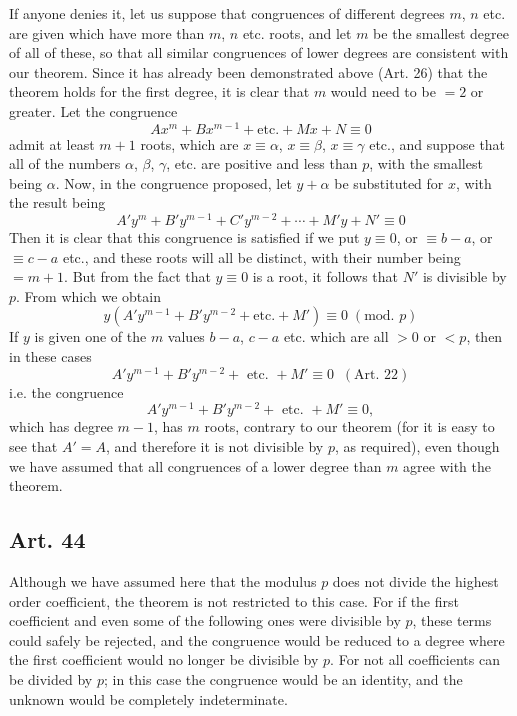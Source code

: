 \documentclass{book}
\theoremstyle{plain}
\theoremstyle{remark}
\begin{document}
If anyone denies it, let us suppose that congruences of different degrees $m$, $n$ etc. are given which have more than $m$, $n$ etc. roots, and let $m$ be the smallest degree of all of these, so that all similar congruences of lower degrees are consistent with our theorem.  Since it has already been demonstrated above (Art. 26) that the theorem holds for the first degree, it is clear that $m$ would need to be $=2$ or greater.  Let the congruence 
\[ Ax^m + Bx^{m-1} + \textrm{etc.} + Mx + N \equiv 0 \]
admit at least $m+1$ roots, which are $x \equiv \alpha$, $x \equiv \beta$, $x \equiv \gamma$ etc., and suppose that all of the numbers $\alpha$, $\beta$, $\gamma$, etc. are positive and less than $p$, with the smallest being $\alpha$.  Now, in the congruence proposed, let $y+\alpha$ be substituted for $x$, with the result being
\[ A' y^m + B' y^{m-1} + C' y^{m-2} + \cdots + M' y + N' \equiv 0 \]
Then it is clear that this congruence is satisfied if we put $y \equiv 0$, or $\equiv b-a$, or $\equiv c-a$ etc., and these roots will all be distinct, with their number being $=m+1$.   But from the fact that $y \equiv 0$ is a root, it follows that $N'$ is divisible by $p$. From which we obtain
\[ y(A'y^{m-1} + B'y^{m-2} + \textrm{etc.} +M' ) \equiv 0 \;(\textrm{mod. } p) \]
If $y$ is given one of the $m$ values $b-a$, $c-a$ etc. which are all $>0$ or $<p$, then in these cases
\[ A'y^{m-1} + B'y^{m-2} + \textrm{ etc. } + M' \equiv 0 \;\;(\textrm{Art. 22}) \]
i.e. the congruence 
\[ A'y^{m-1} + B'y^{m-2} + \textrm{ etc. } + M' \equiv 0, \]
which has degree $m-1$, has $m$ roots, contrary to our theorem (for it is easy to see that $A'=A$, and therefore it is not divisible by $p$, as required), even though we have assumed that all congruences of a lower degree than $m$ agree with the theorem.

\subsection*{Art. 44}

Although we have assumed here that the modulus $p$ does not divide the highest order coefficient, the theorem is not restricted to this case.  For if the first coefficient and even some of the following ones were divisible by $p$, these terms could safely be rejected, and the congruence would be reduced to a degree where the first coefficient would no longer be divisible by $p$.  For not all coefficients can be divided by $p$; in this case the congruence would be an identity, and the unknown would be completely indeterminate.
\end{document}
